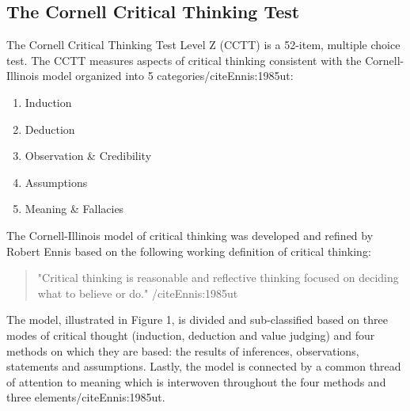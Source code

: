 \subsection{The Cornell Critical Thinking Test}

The Cornell Critical Thinking Test Level Z (CCTT) is a 52-item, multiple choice test. The CCTT measures aspects of critical thinking consistent with the Cornell-Illinois model organized into 5 categories/cite{Ennis:1985ut}:

\begin{enumerate}
\item Induction
\item Deduction
\item Observation & Credibility
\item Assumptions
\item Meaning & Fallacies
\end{enumerate}

The Cornell-Illinois model of critical thinking was developed and refined by Robert Ennis based on the following working definition of critical thinking:

\begin{quote}
"Critical thinking is reasonable and reflective thinking focused on deciding what to believe or do." /cite{Ennis:1985ut}
\end{quote}

The model, illustrated in Figure 1, is divided and sub-classified based on three modes of critical thought (induction, deduction and value judging) and four methods on which they are based: the results of inferences, observations, statements and assumptions. Lastly, the model is connected by a common thread of attention to meaning which is interwoven throughout the four methods and three elements/cite{Ennis:1985ut}. 

